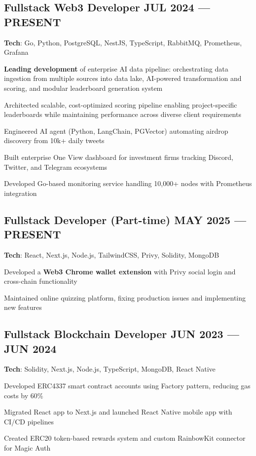 \documentclass[letter,10pt]{article}
\begin{document}
\subsection{{Fullstack Web3 Developer \hfill JUL 2024 --- PRESENT}}
\begin{zitemize}
  \item \textbf{Tech}: Go, Python, PostgreSQL, NestJS, TypeScript, RabbitMQ, Prometheus, Grafana
  \item \textbf{Leading development} of enterprise AI data pipeline: orchestrating data ingestion from multiple sources into data lake, AI-powered transformation and scoring, and modular leaderboard generation system
  \item Architected scalable, cost-optimized scoring pipeline enabling project-specific leaderboards while maintaining performance across diverse client requirements
  \item Engineered AI agent (Python, LangChain, PGVector) automating airdrop discovery from 10k+ daily tweets
  \item Built enterprise One View dashboard for investment firms tracking Discord, Twitter, and Telegram ecosystems
  \item Developed Go-based monitoring service handling 10,000+ nodes with Prometheus integration
\end{zitemize}


\subsection{{Fullstack Developer (Part-time) \hfill MAY 2025 --- PRESENT}}
\begin{zitemize}
  \item \textbf{Tech}: React, Next.js, Node.js, TailwindCSS, Privy, Solidity, MongoDB
  \item Developed a \textbf{Web3 Chrome wallet extension} with Privy social login and cross-chain functionality
  \item Maintained online quizzing platform, fixing production issues and implementing new features
\end{zitemize}



\subsection{{ Fullstack Blockchain Developer \hfill JUN 2023 --- JUN 2024}}
\begin{zitemize}
  \item \textbf{Tech}: Solidity, Next.js, Node.js, TypeScript, MongoDB, React Native
  \item Developed ERC4337 smart contract accounts using Factory pattern, reducing gas costs by 60\%
  \item Migrated React app to Next.js and launched React Native mobile app with CI/CD pipelines
  \item Created ERC20 token-based rewards system and custom RainbowKit connector for Magic Auth
\end{zitemize}
\end{document}
